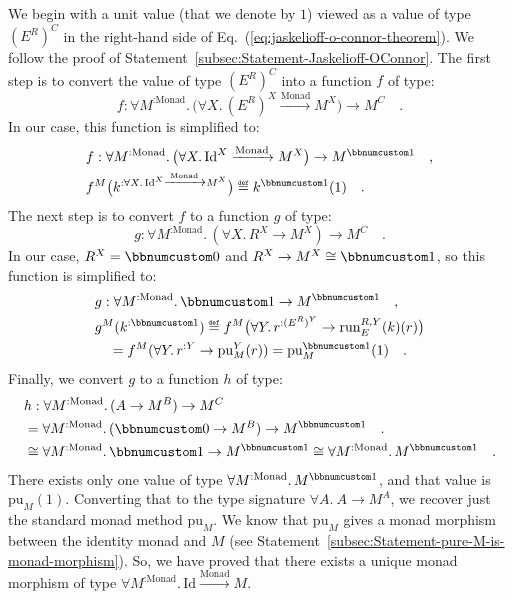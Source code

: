 We begin with a unit value (that we denote by $1$) viewed as a value
of type $(E^{R})^{C}$ in the right-hand side of Eq.~(\ref{eq:jaskelioff-o-connor-theorem}).
We follow the proof of Statement~\ref{subsec:Statement-Jaskelioff-OConnor}.
The first step is to convert the value of type $(E^{R})^{C}$ into
a function $f$ of type:
\[
f:\forall M^{:\text{Monad}}.\,\big(\forall X.\,(E^{R})^{X}\xrightarrow{\text{Monad}}M^{X}\big)\rightarrow M^{C}\quad.
\]
In our case, this function is simplified to:
\begin{align*}
 & f:\forall M^{:\text{Monad}}.\,\big(\forall X.\,\text{Id}^{X}\xrightarrow{\text{Monad}}M^{X}\big)\rightarrow M^{\bbnum 1}\quad,\\
 & f^{M}\big(k^{:\forall X.\,\text{Id}^{X}\xrightarrow{\text{Monad}}M^{X}}\big)\triangleq k^{\bbnum 1}(1)\quad.
\end{align*}
The next step is to convert $f$ to a function $g$ of type:
\[
g:\forall M^{:\text{Monad}}.\,(\forall X.\,R^{X}\rightarrow M^{X})\rightarrow M^{C}\quad.
\]
In our case, $R^{X}=\bbnum 0$ and $R^{X}\rightarrow M^{X}\cong\bbnum 1$,
so this function is simplified to: 
\begin{align*}
 & g:\forall M^{:\text{Monad}}.\,\bbnum 1\rightarrow M^{\bbnum 1}\quad,\\
 & g^{M}(k^{:\bbnum 1})\triangleq f^{M}\big(\forall Y.\,r^{:(E^{R})^{Y}}\rightarrow\text{run}_{E}^{R,Y}(k)(r)\big)\\
 & \quad=f^{M}(\forall Y.\,r^{:Y}\rightarrow\text{pu}_{M}^{Y}(r))=\text{pu}_{M}^{\bbnum 1}(1)\quad.
\end{align*}
Finally, we convert $g$ to a function $h$ of type:
\begin{align*}
 & h:\forall M^{:\text{Monad}}.\,(A\rightarrow M^{B})\rightarrow M^{C}\\
 & =\forall M^{:\text{Monad}}.\,(\bbnum 0\rightarrow M^{B})\rightarrow M^{\bbnum 1}\quad.\\
 & \cong\forall M^{:\text{Monad}}.\,\bbnum 1\rightarrow M^{\bbnum 1}\cong\forall M^{:\text{Monad}}.\,M^{\bbnum 1}\quad.
\end{align*}
 There exists only one value of type $\forall M^{:\text{Monad}}.\,M^{\bbnum 1}$,
and that value is $\text{pu}_{M}(1)$. Converting that to the type
signature $\forall A.\:A\rightarrow M^{A}$, we recover just the standard
monad method $\text{pu}_{M}$. We know that $\text{pu}_{M}$ gives
a monad morphism between the identity monad and $M$ (see Statement~\ref{subsec:Statement-pure-M-is-monad-morphism}).
So, we have proved that there exists a unique monad morphism of type
$\forall M^{:\text{Monad}}.\,\text{Id}\xrightarrow{\text{Monad}}M$. 

